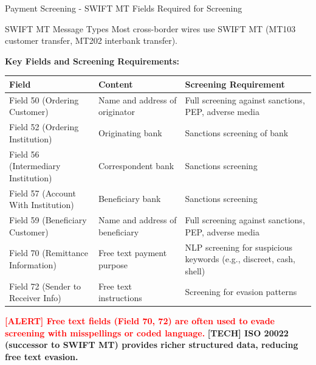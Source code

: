 \documentclass[11pt,a4paper]{beamer}
\newcommand{\redflag}[1]{\textcolor{red}{\textbf{[ALERT] #1}}}
\newcommand{\techterm}[1]{\textcolor{cyan!50!black}{\textbf{[TECH] #1}}}
\begin{document}
	\begin{frame}{Payment Screening - SWIFT MT Fields Required for Screening}
		\begin{block}{SWIFT MT Message Types}
			Most cross-border wires use SWIFT MT (MT103 customer transfer, MT202 interbank transfer).
		\end{block}
		
		\textbf{Key Fields and Screening Requirements:}
		\begin{longtable}{p{}|p{}|p{}}
			\hline
			\rowcolor{lightgray}
			\textbf{Field} & \textbf{Content} & \textbf{Screening Requirement} \\
			\hline
			Field 50 (Ordering Customer) & Name and address of originator & Full screening against sanctions, PEP, adverse media \\
			\hline
			Field 52 (Ordering Institution) & Originating bank & Sanctions screening of bank \\
			\hline
			Field 56 (Intermediary Institution) & Correspondent bank & Sanctions screening \\
			\hline
			Field 57 (Account With Institution) & Beneficiary bank & Sanctions screening \\
			\hline
			Field 59 (Beneficiary Customer) & Name and address of beneficiary & Full screening against sanctions, PEP, adverse media \\
			\hline
			Field 70 (Remittance Information) & Free text payment purpose & NLP screening for suspicious keywords (e.g., discreet, cash, shell) \\
			\hline
			Field 72 (Sender to Receiver Info) & Free text instructions & Screening for evasion patterns \\
			\hline
		\end{longtable}
		
		\redflag{Free text fields (Field 70, 72) are often used to evade screening with misspellings or coded language.}
		\techterm{ISO 20022 (successor to SWIFT MT) provides richer structured data, reducing free text evasion.}
	\end{frame}
	
\end{document}
